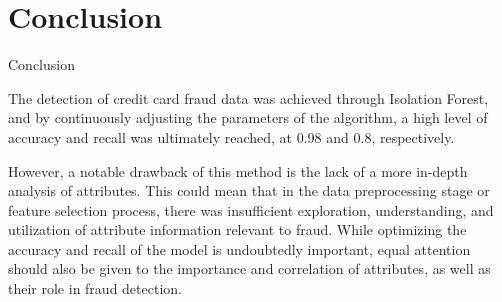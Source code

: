 \documentclass[
 size=14pt,
 paper=smartboard,  %
 mode=present, 		%
 display=slides, 	%
 style=tuliplab,  	%
 pauseslide,
 fleqn,leqno]{powerdot}
\begin{document}
\section{Conclusion}

\begin{slide}[toc=,bm=]{Conclusion}

\begin{justify}
	\setlength{\parindent}{2em}
	The detection of credit card fraud data was achieved through Isolation Forest, and by continuously adjusting the parameters of the algorithm, a high level of accuracy and recall was ultimately reached, at 0.98 and 0.8, respectively.
\end{justify}

\begin{justify}
	\setlength{\parindent}{2em}
	However, a notable drawback of this method is the lack of a more in-depth analysis of attributes. This could mean that in the data preprocessing stage or feature selection process, there was insufficient exploration, understanding, and utilization of attribute information relevant to fraud. While optimizing the accuracy and recall of the model is undoubtedly important, equal attention should also be given to the importance and correlation of attributes, as well as their role in fraud detection.
\end{justify}

\end{slide}
\end{document}
